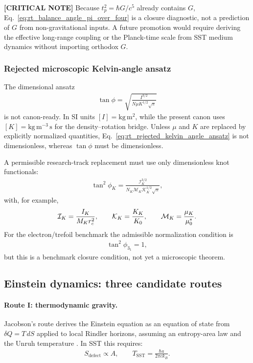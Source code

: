 \textbf{[CRITICAL NOTE]} Because \(t_p^2=\hbar G/c^5\) already contains \(G\),
Eq.~\eqref{eq:rt_balance_angle_pi_over_four} is a closure diagnostic, not a
prediction of \(G\) from non-gravitational inputs.  A future promotion would
require deriving the effective long-range coupling or the Planck-time scale
from SST medium dynamics without importing orthodox \(G\).

\subsubsection{Rejected microscopic Kelvin-angle ansatz}
The dimensional ansatz
\begin{align}
    \tan\phi
    =
    \sqrt{
    \frac{I^{3/2}}{N\mu K^{1/2}\sqrt{\pi}}
    }
    \label{eq:rt_rejected_kelvin_angle_ansatz}
\end{align}
is not canon-ready.  In SI units \([I]=\mathrm{kg\,m^2}\), while the present
canon uses \([K]=\mathrm{kg\,m^{-3}\,s}\) for the density--rotation bridge.
Unless \(\mu\) and \(K\) are replaced by explicitly normalized quantities,
Eq.~\eqref{eq:rt_rejected_kelvin_angle_ansatz} is not dimensionless, whereas
\(\tan\phi\) must be dimensionless.

A permissible research-track replacement must use only dimensionless knot
functionals:
\begin{align}
    \tan^2\phi_K
    =
    \frac{\mathcal{I}_K^{3/2}}
    {N_K\mathcal{M}_K\mathcal{K}_K^{1/2}\sqrt{\pi}},
    \label{eq:rt_dimensionless_kelvin_angle}
\end{align}
with, for example,
\begin{align}
    \mathcal{I}_K=\frac{I_K}{M_Kr_c^2},
    \qquad
    \mathcal{K}_K=\frac{K_K}{K_0},
    \qquad
    \mathcal{M}_K=\frac{\mu_K}{\mu_0^\ast}.
\end{align}
For the electron/trefoil benchmark the admissible normalization condition is
\begin{align}
    \tan^2\phi_{3_1}=1,
\end{align}
but this is a benchmark closure condition, not yet a microscopic theorem.

\subsection{Einstein dynamics: three candidate routes}

\paragraph{Route I: thermodynamic gravity.}
Jacobson's route derives the Einstein equation as an equation of state from
\(\delta Q=T\,dS\) applied to local Rindler horizons, assuming an entropy-area
law and the Unruh temperature \cite{Jacobson1995}. In SST this requires:
\begin{align}
    S_{\mathrm{defect}}
    \propto
    A,
    \qquad
    T_{\mathrm{SST}}
    =
    \frac{\hbar a}{2\pi c k_B}.
\end{align}

